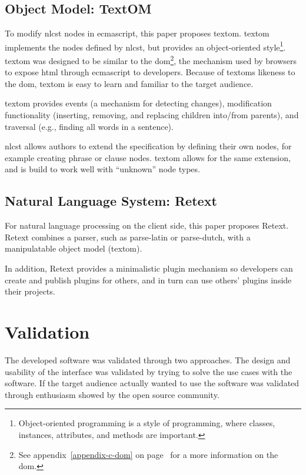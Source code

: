 \section{Object Model: TextOM}\label{object-model}

To modify \gls{nlcst} nodes in \gls{ecmascript}, this paper proposes
\gls{textom}. \gls{textom} implements the nodes defined by \gls{nlcst},
but provides an object-oriented style\footnote{Object-oriented
  programming is a style of programming, where classes, instances,
  attributes, and methods are important.}. \gls{textom} was designed to
  be similar to the \gls{dom}\footnote{See appendix~\ref{appendix-c-dom} on
  page~\pageref{appendix-c-dom} for a more
  information on the \gls{dom}.}, the mechanism used by browsers to
expose \gls{html} through \gls{ecmascript} to developers. Because of
\glspl{textom} likeness to the \gls{dom}, \gls{textom} is easy to learn
and familiar to the target audience.

\gls{textom} provides events (a mechanism for detecting changes),
modification functionality (inserting, removing, and replacing children
into\slash from parents), and traversal (e.g., finding all words in a
sentence).

\gls{nlcst} allows authors to extend the specification by defining their
own nodes, for example creating phrase or clause nodes. \gls{textom}
allows for the same extension, and is build to work well with
``unknown'' node types.

\section{Natural Language System:
Retext}\label{natural-language-system-retext}

For natural language processing on the client side, this paper proposes
Retext. Retext combines a parser, such as parse-latin or parse-dutch,
with a manipulatable object model (\gls{textom}).

In addition, Retext provides a minimalistic plugin mechanism so
developers can create and publish plugins for others, and in turn can
use others' plugins inside their projects.

\chapter{Validation}\label{validation}

The developed software was validated through two approaches. The design
and usability of the interface was validated by trying to solve the use
cases with the software. If the target audience actually wanted to use
the software was validated through enthusiasm showed by the open source
community.

